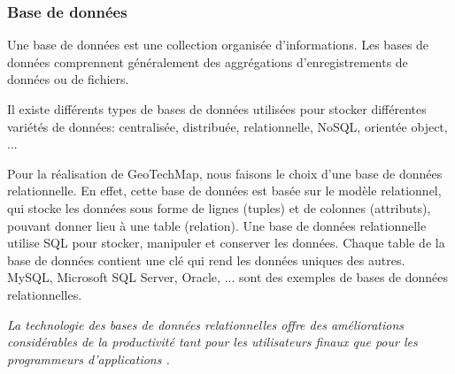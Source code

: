          \subsubsection{Base de données}
         Une base de données est une collection organisée d'informations. Les bases de données
         comprennent généralement des aggrégations d'enregistrements de données ou de fichiers. 
         \par 
         Il existe différents types de bases de données utilisées pour stocker différentes 
         variétés de données: centralisée, distribuée, relationnelle, NoSQL, 
         orientée object, ... \cite{typedb}
         \par 
         Pour la réalisation de GeoTechMap, nous faisons le choix d'une base de données relationnelle.
         En effet, cette base de données est basée sur le modèle relationnel, qui stocke les 
         données sous forme de lignes (tuples) et de colonnes (attributs), pouvant donner lieu à une table 
         (relation). Une base de données relationnelle utilise SQL pour stocker, manipuler et conserver 
         les données. Chaque table de la base de données 
         contient une clé qui rend les données uniques des autres. MySQL, Microsoft SQL Server, Oracle, ... 
         sont des exemples de bases de données relationnelles.
         \par 
         \textit{La technologie des bases de données relationnelles offre des améliorations considérables 
         de la productivité tant pour les utilisateurs finaux que pour les programmeurs d'applications \cite{codd1989relational}.}
